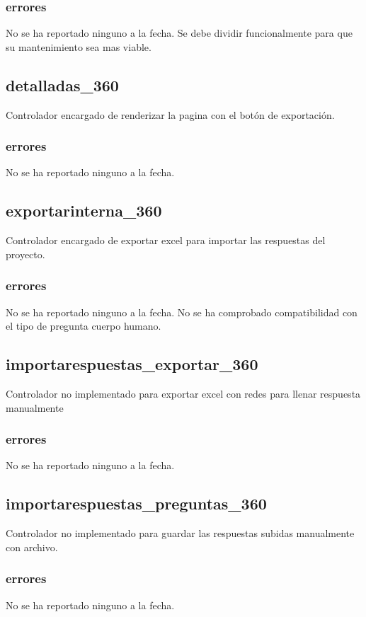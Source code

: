 \documentclass[10pt,a4paper]{book}
\begin{document}
	\subsubsection{errores}
	No se ha reportado ninguno a la fecha. Se debe dividir funcionalmente para que su mantenimiento sea mas viable.
	
	\subsection{detalladas\_360}
	Controlador encargado de renderizar la pagina con el botón de exportación.
	\subsubsection{errores}
	No se ha reportado ninguno a la fecha.
	
	\subsection{exportarinterna\_360}
	Controlador encargado de exportar excel para importar las respuestas del proyecto.
	\subsubsection{errores}
	No se ha reportado ninguno a la fecha. No se ha comprobado compatibilidad con el tipo de pregunta cuerpo humano.
	
	\subsection{importarespuestas\_exportar\_360}
	Controlador no implementado para exportar excel con redes para llenar respuesta manualmente
	\subsubsection{errores}
	No se ha reportado ninguno a la fecha.
	
	\subsection{importarespuestas\_preguntas\_360}
	Controlador no implementado para guardar las respuestas subidas manualmente con archivo. 
	\subsubsection{errores}
	No se ha reportado ninguno a la fecha.
	
\end{document}
